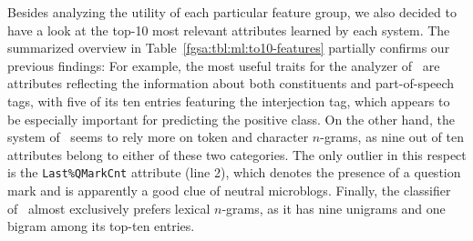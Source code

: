 Besides analyzing the utility of each particular feature group, we
also decided to have a look at the top-10 most relevant attributes
learned by each system.  The summarized overview in
Table~\ref{fgsa:tbl:ml:to10-features} partially confirms our previous
findings: For example, the most useful traits for the analyzer
of~\citet{Gamon:04} are attributes reflecting the information about
both constituents and part-of-speech tags, with five of its ten
entries featuring the interjection tag, which appears to be especially
important for predicting the positive class.  On the other hand, the
system of~\citet{Mohammad:13} seems to rely more on token and
character $n$-grams, as nine out of ten attributes belong to either of
these two categories. The only outlier in this respect is the
\texttt{Last\%QMarkCnt} attribute (line 2), which denotes the presence
of a question mark and is apparently a good clue of neutral
microblogs.  Finally, the classifier of~\citet{Guenther:14} almost
exclusively prefers lexical $n$-grams, as it has nine unigrams and one
bigram among its top-ten entries.

